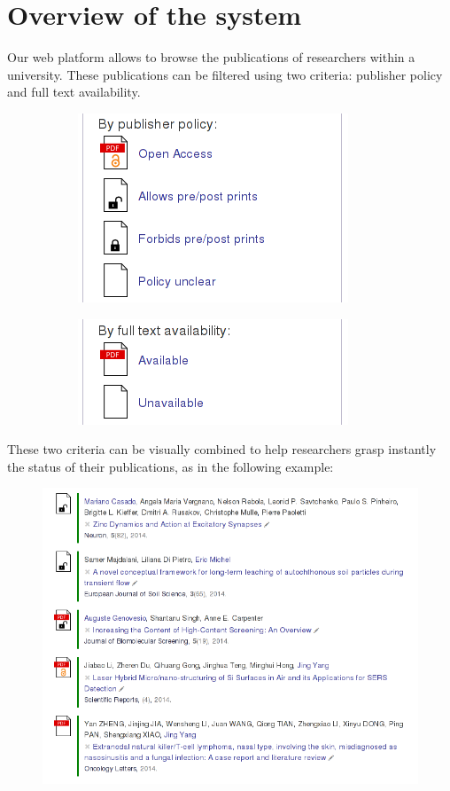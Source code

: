 \documentclass[a4paper]{article}
\begin{document}
\section{Overview of the system}

Our web platform allows to browse the publications of researchers within
a university. These publications can be filtered using two criteria:
publisher policy and full text availability.

\begin{figure}[htbp]
\centering
\begin{subfigure}[b]{0.45\textwidth}
\includegraphics[scale=0.5]{img/policy.png}
\end{subfigure}
\begin{subfigure}[b]{0.45\textwidth}
\includegraphics[scale=0.5]{img/availability.png}
\vspace{0.4cm}
\end{subfigure}
\end{figure}

These two criteria can be visually combined to help researchers grasp
instantly the status of their publications, as in the following example:

\begin{figure}[htbp]
\centering
\includegraphics[scale=0.5]{img/publist.png}
\end{figure}
\end{document}
